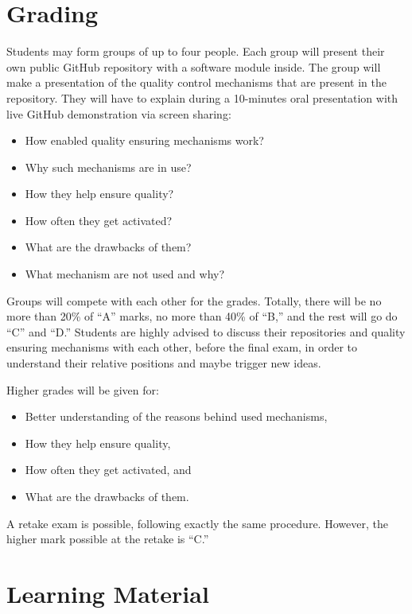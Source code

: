 \documentclass[nobrand,anonymous,nodate,nosecurity]{huawei}
\begin{document}
{\newpage
\section*{Grading}

Students may form groups of up to four people. Each group will present
their own public GitHub repository with a software module inside. The group
will make a presentation of the quality control mechanisms that are
present in the repository. They will have to explain during a 10-minutes
oral presentation with live GitHub demonstration via screen sharing:

\begin{itemize}
	\item How enabled quality ensuring mechanisms work?
	\item Why such mechanisms are in use?
	\item How they help ensure quality?
	\item How often they get activated?
	\item What are the drawbacks of them?
	\item What mechanism are not used and why?
\end{itemize}

Groups will compete with each other for the grades. Totally, there will
be no more than 20\% of ``A'' marks, no more than 40\% of ``B,''
and the rest will go do ``C'' and ``D.'' Students are highly advised to discuss
their repositories and quality ensuring mechanisms with each other,
before the final exam, in order to understand their relative positions
and maybe trigger new ideas.

Higher grades will be given for:

\begin{itemize}
	\item Better understanding of the reasons behind used mechanisms,
	\item How they help ensure quality,
	\item How often they get activated,
	and
	\item What are the drawbacks of them.
\end{itemize}

A retake exam is possible, following exactly the same procedure. However,
the higher mark possible at the retake is ``C.''

\newpage
\section*{Learning Material}

}
\end{document}
